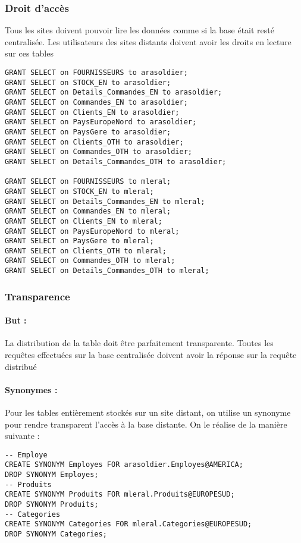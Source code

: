 \documentclass[10pt,a4paper,twoside]{article}
\begin{document}
\subsubsection{Droit d'accès}
Tous les sites doivent pouvoir lire les données comme si la base était resté centralisée. Les utilisateurs des sites distants doivent avoir les droits en lecture sur ces tables 
\begin{verbatim}
GRANT SELECT on FOURNISSEURS to arasoldier;
GRANT SELECT on STOCK_EN to arasoldier;
GRANT SELECT on Details_Commandes_EN to arasoldier;
GRANT SELECT on Commandes_EN to arasoldier;
GRANT SELECT on Clients_EN to arasoldier;
GRANT SELECT on PaysEuropeNord to arasoldier;
GRANT SELECT on PaysGere to arasoldier;
GRANT SELECT on Clients_OTH to arasoldier;
GRANT SELECT on Commandes_OTH to arasoldier;
GRANT SELECT on Details_Commandes_OTH to arasoldier;

GRANT SELECT on FOURNISSEURS to mleral;
GRANT SELECT on STOCK_EN to mleral;
GRANT SELECT on Details_Commandes_EN to mleral;
GRANT SELECT on Commandes_EN to mleral;
GRANT SELECT on Clients_EN to mleral;
GRANT SELECT on PaysEuropeNord to mleral;
GRANT SELECT on PaysGere to mleral;
GRANT SELECT on Clients_OTH to mleral;
GRANT SELECT on Commandes_OTH to mleral;
GRANT SELECT on Details_Commandes_OTH to mleral;
\end{verbatim}

\subsubsection{Transparence}
\paragraph{But :} La distribution de la table doit être parfaitement transparente. Toutes les requêtes effectuées sur la base centralisée doivent avoir la réponse sur la requête distribué

\paragraph{Synonymes :} Pour les tables entièrement stockés sur un site distant, on utilise un synonyme pour rendre transparent l'accès à la base distante. On le réalise de la manière suivante :
\begin{verbatim}
-- Employe
CREATE SYNONYM Employes FOR arasoldier.Employes@AMERICA;
DROP SYNONYM Employes;
-- Produits
CREATE SYNONYM Produits FOR mleral.Produits@EUROPESUD;
DROP SYNONYM Produits;
-- Categories
CREATE SYNONYM Categories FOR mleral.Categories@EUROPESUD;
DROP SYNONYM Categories;
\end{verbatim}
\end{document}
